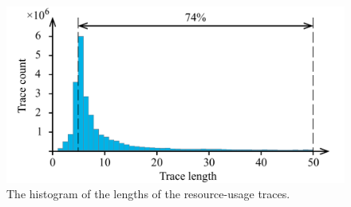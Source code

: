 \begin{figure}[t]
  \centering
  \includegraphics[width=1.0\columnwidth]{include/assets/figures/histogram.pdf}
  \caption{The histogram of the lengths of the resource-usage traces.}
\end{figure}
